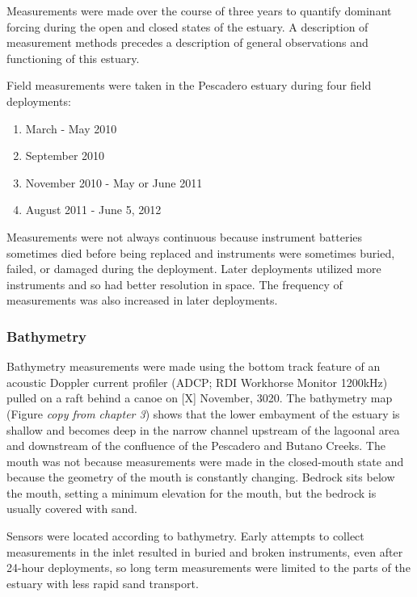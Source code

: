 Measurements were made over the course of three years to quantify dominant forcing during the open and closed states of the estuary. A description of measurement methods precedes a description of general observations and functioning of this estuary.

Field measurements were taken in the Pescadero estuary during four field deployments:

\begin{enumerate}
	\item March - May 2010 
	\item September 2010 
	\item November 2010 - May or June 2011 
	\item August 2011 - June 5, 2012
\end{enumerate}

 Measurements were not always continuous because instrument batteries sometimes died before being replaced and instruments were sometimes buried, failed, or damaged during the deployment. Later deployments utilized more instruments and so had better resolution in space.  The frequency of measurements was also increased in later deployments. 

\subsubsection{Bathymetry} \label{sssec:bathymetry}
Bathymetry measurements were made using the bottom track feature of an acoustic Doppler current profiler (ADCP; RDI Workhorse Monitor 1200kHz) pulled on a raft behind a canoe on [X] November, 3020. The bathymetry map (Figure \emph{copy from chapter 3}) shows that the lower embayment of the estuary is shallow and becomes deep in the narrow channel upstream of the lagoonal area and downstream of the confluence of the Pescadero and Butano Creeks. The mouth was not because measurements were made in the closed-mouth state and because the geometry of the mouth is constantly changing. Bedrock sits below the mouth, setting a minimum elevation for the mouth, but the bedrock is usually covered with sand. 

Sensors were located according to bathymetry. Early attempts to collect measurements in the inlet resulted in buried and broken instruments, even after 24-hour deployments, so long term measurements were limited to the parts of the estuary with less rapid sand transport. 

